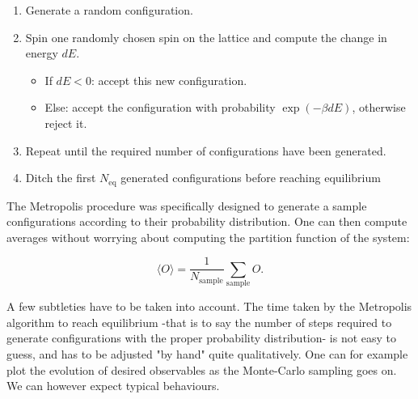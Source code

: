 \documentclass[11pt,openany]{article}
\begin{document}
\begin{tcolorbox}[title=Metropolis-Hasting algorithm]
	
	\begin{enumerate}
		
		\item Generate a random configuration.
		
		\item Spin one randomly chosen spin on the lattice and compute the change in energy $dE$.
			\begin{itemize}
				\item If $dE<0$: accept this new configuration.
				
				\item Else: accept the configuration with probability $\exp\left(-\beta dE\right)$, otherwise reject it.
			\end{itemize}
		
		\item Repeat until the required number of configurations have been generated.
		
		\item Ditch the first $N_\mathrm{eq}$ generated configurations before reaching equilibrium
		
	\end{enumerate}
	
\end{tcolorbox}

The Metropolis procedure was specifically designed to generate a sample configurations according to their probability distribution. One can then compute averages without worrying about computing the partition function of the system:

\begin{equation}
	\langle O\rangle = \frac{1}{N_\mathrm{sample}}\sum_\mathrm{sample} O.
\end{equation}

A few subtleties have to be taken into account. The time taken by the Metropolis algorithm to reach equilibrium -that is to say the number of steps required to generate configurations with the proper probability distribution- is not easy to guess, and has to be adjusted "by hand" quite qualitatively. One can for example plot the evolution of desired observables as the Monte-Carlo sampling goes on. We can however expect typical behaviours.
\end{document}
